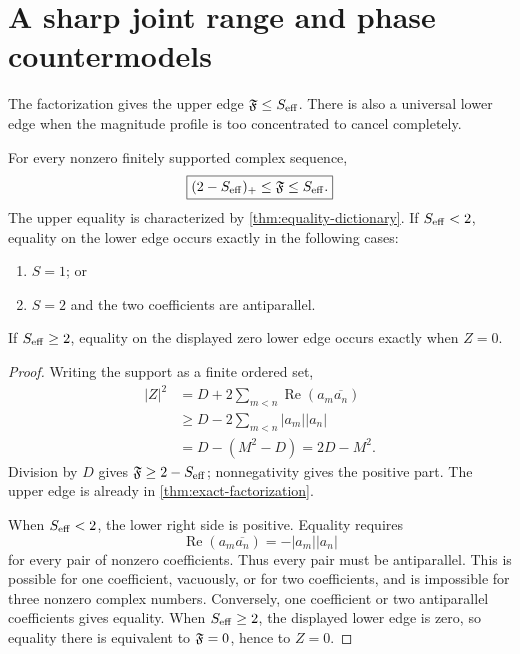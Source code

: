 \section{A sharp joint range and phase countermodels}
\label{sec:sharp-range}

The factorization gives the upper edge
\(\mathfrak F\le S_{\mathrm{eff}}\).  There is also a universal lower edge when the
magnitude profile is too concentrated to cancel completely.

\begin{theorem}
\label{thm:sharp-strip}
For every nonzero finitely supported complex sequence,
\begin{equation}
 \boxed{
 (2-S_{\mathrm{eff}})_+\le\mathfrak F\le S_{\mathrm{eff}}.}
\label{eq:sharp-strip}
\end{equation}
The upper equality is characterized by
\cref{thm:equality-dictionary}.  If \(S_{\mathrm{eff}}<2\), equality on the
lower edge occurs exactly in the following cases:
\begin{enumerate}[label=(\alph*),leftmargin=2.2em]
\item \(S=1\); or
\item \(S=2\) and the two coefficients are antiparallel.
\end{enumerate}
If \(S_{\mathrm{eff}}\ge2\), equality on the displayed zero lower edge occurs
exactly when \(Z=0\).
\end{theorem}

\begin{proof}
Writing the support as a finite ordered set,
\begin{align*}
 |Z|^2
 &=
 D+2\sum_{m<n}\operatorname{Re}(a_m\overline{a_n})\\
 &\ge
 D-2\sum_{m<n}|a_m||a_n|\\
 &=
 D-(M^2-D)
 =
 2D-M^2.
\end{align*}
Division by \(D\) gives
\(\mathfrak F\ge2-S_{\mathrm{eff}}\); nonnegativity gives the positive part.
The upper edge is already in \cref{thm:exact-factorization}.

When \(S_{\mathrm{eff}}<2\), the lower right side is positive.  Equality requires
\[
 \operatorname{Re}(a_m\overline{a_n})
 =-|a_m||a_n|
\]
for every pair of nonzero coefficients.  Thus every pair must be
antiparallel.  This is possible for one coefficient, vacuously, or
for two coefficients, and is impossible for three nonzero complex
numbers.  Conversely, one coefficient or two antiparallel
coefficients gives equality.  When \(S_{\mathrm{eff}}\ge2\), the displayed
lower edge is zero, so equality there is equivalent to
\(\mathfrak F=0\), hence to \(Z=0\).
\end{proof}

